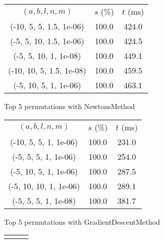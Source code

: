 \begin{figure}[H]
\label{fig:param_comp_MatrixSquareSum_UniformSearch}
\begin{subfigure}[ht]{.5\textwidth}
\begin{tabular}{|c|c|c|}
\hline
\rowcolor{gray!25}
\multicolumn{3}{|c|}{NewtonsMethod} \\
\hline
\rowcolor{gray!25}
$(a,b,l,n,m)$ & $s$ (\%) & $t$ (ms) \\
\hline
(-10, 5, 5, 1.5, 1e-06) & 100.0 & 424.0 \\
(-5, 5, 10, 1.5, 1e-06) & 100.0 & 424.5 \\
(-5, 5, 10, 1, 1e-08) & 100.0 & 449.1 \\
(-10, 10, 5, 1.5, 1e-08) & 100.0 & 459.5 \\
(-5, 10, 5, 1, 1e-06) & 100.0 & 463.1 \\
\hline
\end{tabular}
\caption{Top 5 permutations with NewtonsMethod}
\label{subfig:param_comp_MatrixSquareSum_NewtonsMethod_UniformSearch}
\end{subfigure}
\hfill
\begin{subfigure}[ht]{.5\textwidth}
\begin{tabular}{|c|c|c|}
\hline
\rowcolor{gray!25}
\multicolumn{3}{|c|}{GradientDescentMethod} \\
\hline
\rowcolor{gray!25}
$(a,b,l,n,m)$ & $s$ (\%) & $t$ (ms) \\
\hline
(-10, 5, 5, 1, 1e-06) & 100.0 & 231.0 \\
(-5, 5, 5, 1, 1e-06) & 100.0 & 254.0 \\
(-5, 10, 5, 1, 1e-06) & 100.0 & 287.5 \\
(-5, 10, 10, 1, 1e-06) & 100.0 & 289.1 \\
(-5, 5, 5, 1, 1e-08) & 100.0 & 381.7 \\
\hline
\end{tabular}
\caption{Top 5 permutations with GradientDescentMethod}
\label{subfig:param_comp_MatrixSquareSum_GradientDescentMethod_UniformSearch}
\end{subfigure}
\hfill
\begin{subfigure}[ht]{.5\textwidth}
\begin{tabular}{|c|c|c|}
\hline
\rowcolor{gray!25}
\multicolumn{3}{|c|}{ConjugateGradientMethod} \\

\end{tabular}
\end{subfigure}
\end{figure}
